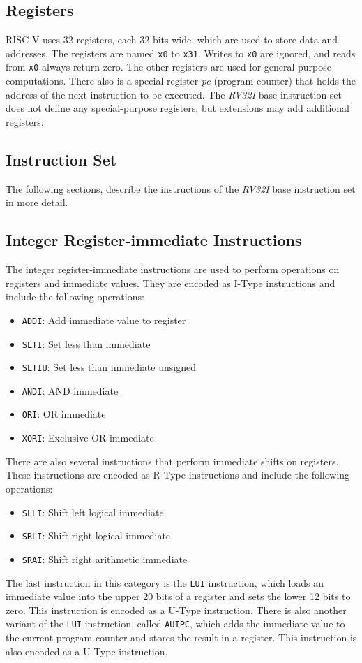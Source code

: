 \documentclass[sigconf]{acmart}
\begin{document}
\subsection{Registers}
RISC-V uses 32 registers, each 32 bits wide, which are used to store data and addresses. The registers are named \texttt{x0} to \texttt{x31}. Writes to \texttt{x0} are ignored, and reads from \texttt{x0} always return zero. The other registers are used for general-purpose computations.
There also is a special register \textit{pc} (program counter) that holds the address of the next instruction to be executed. The \textit{RV32I} base instruction set does not define any special-purpose registers, but extensions may add additional registers. \cite{riscv-spec}


\subsection{Instruction Set}
The following sections, describe the instructions of the \textit{RV32I} base instruction set in more detail.

\subsection{Integer Register-immediate Instructions}
The integer register-immediate instructions are used to perform operations on registers and immediate values. They are encoded as I-Type instructions and include the following operations:
\begin{itemize}
    \item \texttt{ADDI}: Add immediate value to register
    \item \texttt{SLTI}: Set less than immediate
    \item \texttt{SLTIU}: Set less than immediate unsigned
    \item \texttt{ANDI}: AND immediate
    \item \texttt{ORI}: OR immediate
    \item \texttt{XORI}: Exclusive OR immediate
\end{itemize}
There are also several instructions that perform immediate shifts on registers. These instructions are encoded as R-Type instructions and include the following operations:
\begin{itemize}
    \item \texttt{SLLI}: Shift left logical immediate
    \item \texttt{SRLI}: Shift right logical immediate
    \item \texttt{SRAI}: Shift right arithmetic immediate
\end{itemize}
The last instruction in this category is the \texttt{LUI} instruction, which loads an immediate value into the upper 20 bits of a register and sets the lower 12 bits to zero. This instruction is encoded as a U-Type instruction.
There is also another variant of the \texttt{LUI} instruction, called \texttt{AUIPC}, which adds the immediate value to the current program counter and stores the result in a register. This instruction is also encoded as a U-Type instruction. \cite{riscv-spec}
\end{document}
